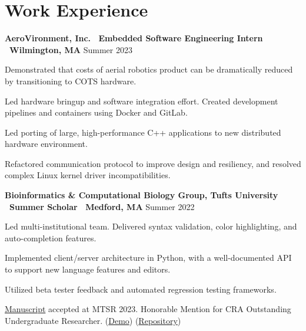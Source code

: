 \documentclass[letter,10pt]{article}
\newenvironment{mylist}[1][]
    {\itemize[nosep, wide=0pt, leftmargin=*, after=\strut]}
    {\enditemize}
\begin{document}

\section{Work Experience}
\begin{minipage}[t]{\linewidth}
    \textbf{AeroVironment, Inc. \textbar \ Embedded Software Engineering Intern \textbar \ Wilmington, MA} \hfill Summer 2023 
    \begin{mylist}
        \item Demonstrated that costs of aerial robotics product can be dramatically reduced by transitioning to COTS hardware. 
        \item Led hardware bringup and software integration effort. Created development pipelines and containers using Docker and GitLab. 
        \item Led porting of large, high-performance C++ applications to new distributed hardware environment. 
        \item Refactored communication protocol to improve design and resiliency, and resolved complex Linux kernel driver incompatibilities.
    \end{mylist}
\end{minipage}


\begin{minipage}[t]{\linewidth}
    \textbf{Bioinformatics \& Computational Biology Group, Tufts University \textbar \ Summer Scholar \textbar \ Medford, MA} \hfill Summer 2022
    \begin{mylist}
        \item Led multi-institutional team. Delivered syntax validation, color highlighting, and auto-completion features.
        \item Implemented client/server architecture in Python, with a well-documented API to support new language features and editors. 
        \item Utilized beta tester feedback and automated regression testing frameworks.
        \item \href{https://www.eecs.tufts.edu/~lstran01/files/context-sensitive.pdf}{Manuscript} accepted at MTSR 2023. Honorable Mention for CRA Outstanding Undergraduate Researcher. (\href{https://youtu.be/TFLdXxnaBlU}{Demo}) (\href{https://github.com/liam-strand/medford-language-server}{Repository})
    \end{mylist}
\end{minipage}
\end{document}
